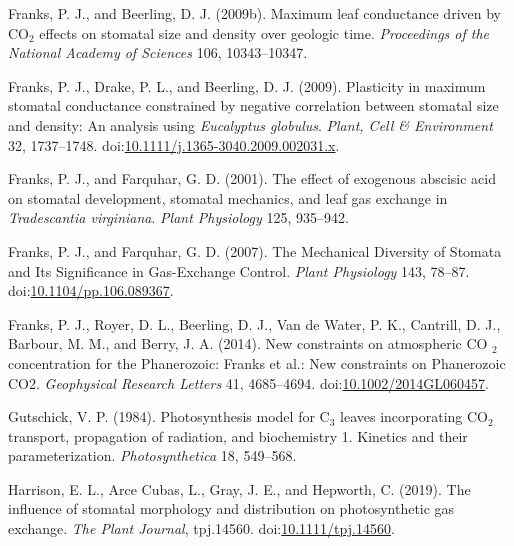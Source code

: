 \documentclass[utf8]{frontiersSCNS}
\begin{document}
\leavevmode\hypertarget{ref-franks_maximum_2009}{}%
Franks, P. J., and Beerling, D. J. (2009b). Maximum leaf conductance
driven by CO\(_{\textrm{2}}\) effects on stomatal size and density over
geologic time. \emph{Proceedings of the National Academy of Sciences}
106, 10343--10347.

\leavevmode\hypertarget{ref-franks_plasticity_2009}{}%
Franks, P. J., Drake, P. L., and Beerling, D. J. (2009). Plasticity in
maximum stomatal conductance constrained by negative correlation between
stomatal size and density: An analysis using \emph{Eucalyptus globulus}.
\emph{Plant, Cell \& Environment} 32, 1737--1748.
doi:\href{https://doi.org/10.1111/j.1365-3040.2009.002031.x}{10.1111/j.1365-3040.2009.002031.x}.

\leavevmode\hypertarget{ref-franks_effect_2001}{}%
Franks, P. J., and Farquhar, G. D. (2001). The effect of exogenous
abscisic acid on stomatal development, stomatal mechanics, and leaf gas
exchange in \emph{Tradescantia virginiana}. \emph{Plant Physiology} 125,
935--942.

\leavevmode\hypertarget{ref-franks_mechanical_2007}{}%
Franks, P. J., and Farquhar, G. D. (2007). The Mechanical Diversity of
Stomata and Its Significance in Gas-Exchange Control. \emph{Plant
Physiology} 143, 78--87.
doi:\href{https://doi.org/10.1104/pp.106.089367}{10.1104/pp.106.089367}.

\leavevmode\hypertarget{ref-franks_new_2014}{}%
Franks, P. J., Royer, D. L., Beerling, D. J., Van de Water, P. K.,
Cantrill, D. J., Barbour, M. M., and Berry, J. A. (2014). New
constraints on atmospheric CO \(_{\textrm{2}}\) concentration for the
Phanerozoic: Franks et al.: New constraints on Phanerozoic CO2.
\emph{Geophysical Research Letters} 41, 4685--4694.
doi:\href{https://doi.org/10.1002/2014GL060457}{10.1002/2014GL060457}.

\leavevmode\hypertarget{ref-gutschick_photosynthesis_1984}{}%
Gutschick, V. P. (1984). Photosynthesis model for C\(_{\textrm{3}}\)
leaves incorporating CO\(_{\textrm{2}}\) transport, propagation of
radiation, and biochemistry 1. Kinetics and their parameterization.
\emph{Photosynthetica} 18, 549--568.

\leavevmode\hypertarget{ref-harrison_influence_2019}{}%
Harrison, E. L., Arce Cubas, L., Gray, J. E., and Hepworth, C. (2019).
The influence of stomatal morphology and distribution on photosynthetic
gas exchange. \emph{The Plant Journal}, tpj.14560.
doi:\href{https://doi.org/10.1111/tpj.14560}{10.1111/tpj.14560}.
\end{document}
